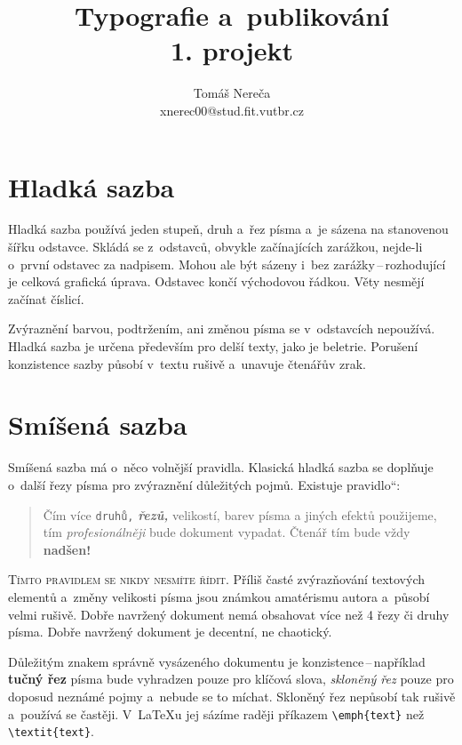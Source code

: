 \documentclass[a4paper, 10pt,twocolumn]{article}
\newcommand{\myuv}[1]{\quotedblbase #1\textquotedblleft}
\begin{document}
\title{Typografie a~publikování\\{\large 1. projekt}}
\author {Tomáš Nereča\\xnerec00@stud.fit.vutbr.cz}
\date{}
\maketitle

\section{Hladká sazba}

Hladká sazba používá jeden stupeň, druh a~řez písma a~je sázena na stanovenou šířku odstavce. Skládá se z~odstavců, obvykle začínajících zarážkou, nejde-li o~první odstavec za nadpisem. Mohou ale být sázeny i~bez zarážky\,--\,rozhodující je celková grafická úprava. Odstavec končí východovou řádkou. Věty nesmějí začínat číslicí.

Zvýraznění barvou, podtržením, ani změnou písma se v~odstavcích nepoužívá. Hladká sazba je určena především pro delší texty, jako je beletrie. Porušení konzistence sazby působí v~textu rušivě a~unavuje čtenářův zrak.

\section{Smí\v{s}ená sazba}
\label{sec2}
Smíšená sazba má o~něco volnější pravidla. Klasická hladká sazba se doplňuje o~další řezy písma pro zvýraznění dů\-le\-ži\-tých pojmů. Existuje \myuv{pravidlo}:


\begin{quotation}
	 Čím více \texttt{druhů,} \textit{\textbf{řezů,}} {\small velikostí,} barev písma \textsf{a jiných efektů} použijeme, tím \textit{profesionálněji} bude dokument vypadat. Čtenář tím {\tiny bude} vždy \bfseries{\huge nadšen!}
\end{quotation}


\textsc{Tímto pravidlem se nikdy nesmíte řídit.} Příliš časté zvýrazňování textových elementů a~změny velikosti písma jsou známkou amatérismu autora a~působí velmi rušivě. Dobře navržený dokument nemá obsahovat více než
4 řezy či druhy písma. Dobře navržený dokument je decentní, ne chaotický.

Důležitým znakem správně vysázeného dokumentu je konzistence\,--\,například \textbf{tučný řez} písma bude vyhradzen pouze pro klíčová slova, \emph{skloněný řez} pouze pro doposud neznámé pojmy a~nebude se to míchat. Skloněný řez nepůsobí tak rušivě a~používá se častěji. V~\LaTeX u jej sázíme raději příkazem \verb|\emph{text}| než \verb|\textit{text}|.
\end{document}
